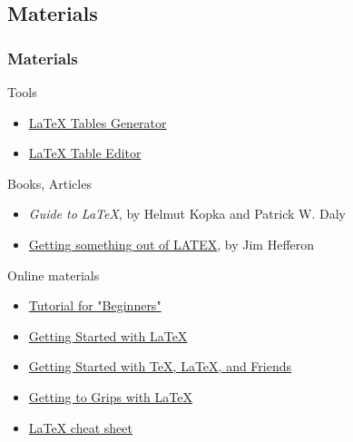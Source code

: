 \documentclass[slidestop,compress,mathserif]{beamer}
\begin{document}

\subsection[Materials]{Materials}
\begin{frame} 
		\frametitle{Materials}

		Tools
		\begin{itemize}
			\item \href{http://www.tablesgenerator.com/latex_tables}{LaTeX Tables Generator}
			\item \href{http://truben.no/table/}{LaTeX Table Editor}
		\end{itemize}
		
		Books, Articles
		\begin{itemize}
			\item \emph{Guide to LaTeX}, by Helmut Kopka and Patrick W. Daly
			\item \href{http://mirror.physik-pool.tu-berlin.de/tex-archive/info/first-latex-doc/first-latex-doc.pdf}{Getting something out of LATEX}, by Jim Hef­feron
		\end{itemize}				
		
		Online materials
		\begin{itemize}
			\item \href{http://www.latex-tutorial.com/tutorials/beginners/}{Tutorial for "Beginners"}
			\item \href{http://www.math.uiuc.edu/~hildebr/tex/latex-start.html}{Getting Started with LaTeX}
			\item \href{https://www.tug.org/begin.html}{Getting Started with TeX, LaTeX, and Friends}
			\item \href{http://www.andy-roberts.net/writing/latexl}{Getting to Grips with LaTeX}
			\item \href{http://wch.github.io/latexsheet/}{LaTeX cheat sheet}
		\end{itemize}				
		
\end{frame}
\end{document}
